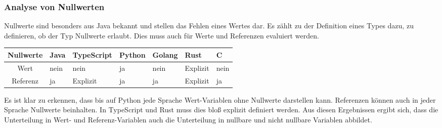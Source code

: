 \documentclass[./einleitung.tex]{subfiles}
\begin{document}
    \subsubsection{Analyse von Nullwerten}
    Nullwerte sind besonders aus Java bekannt und stellen das Fehlen eines Wertes dar.
    Es zählt zu der Definition eines Types dazu, zu definieren, ob der Typ Nullwerte erlaubt.
    Dies muss auch für Werte und Referenzen evaluiert werden.
    \begin{center}
        \begin{tabular}{| c || m{4em} | m{5em} | m{5em} | m{4.5em} | m{4.5em} | m{4.5em} |}
            \hline
            Nullwerte & Java & TypeScript & Python & Golang & Rust     & C    \\
            \hline
            Wert      & nein & nein       & ja     & nein   & Explizit & nein \\
            \hline
            Referenz  & ja   & Explizit   & ja     & ja     & Explizit & ja   \\
            \hline
        \end{tabular}
    \end{center}
    Es ist klar zu erkennen, dass bis auf Python jede Sprache Wert-Variablen ohne Nullwerte darstellen kann.
    Referenzen können auch in jeder Sprache Nullwerte beinhalten.
    In TypeScript und Rust muss dies bloß explizit definiert werden.
    Aus diesen Ergebnissen ergibt sich, dass die Unterteilung in Wert- und Referenz-Variablen auch die Unterteilung in nullbare und nicht nullbare Variablen abbildet.
\end{document}
